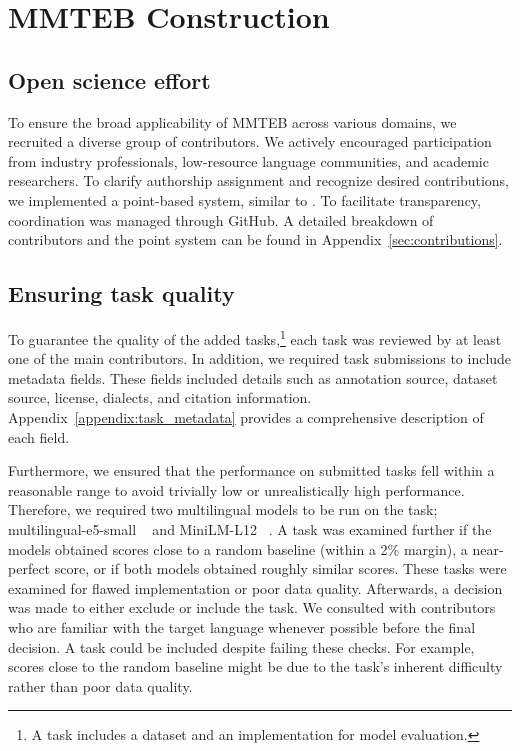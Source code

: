 \section{MMTEB Construction}

\subsection{Open science effort}
\label{sec:open-source-effort}
To ensure the broad applicability of MMTEB across various domains, we recruited a diverse group of contributors. We actively encouraged participation from industry professionals, low-resource language communities, and academic researchers. To clarify authorship assignment and recognize desired contributions, we implemented a point-based system, similar to \citet{lovenia2024seacrowd}.
To facilitate transparency, coordination was managed through GitHub. 
A detailed breakdown of contributors and the point system can be found in Appendix~\ref{sec:contributions}.

\subsection{Ensuring task quality}

To guarantee the quality of the added tasks,\footnote{A task includes a dataset and an implementation for model evaluation.} each task was reviewed by at least one of the main contributors. In addition, we required task submissions to include metadata fields. These fields included details such as annotation source, dataset source, license, dialects, and citation information. Appendix~\ref{appendix:task_metadata} provides a comprehensive description of each field. 

Furthermore, we ensured that the performance on submitted tasks fell within a reasonable range to avoid trivially low or unrealistically high performance. Therefore, we required two multilingual models to be run on the task; multilingual-e5-small
~\citep{wang2022text} and MiniLM-L12
~\citep{reimers2019sentencebert}.
A task was examined further if the models obtained scores close to a random baseline (within a 2\% margin), a near-perfect score, or if both models obtained roughly similar scores. 
These tasks were examined for flawed implementation or poor data quality. Afterwards, a decision was made to either exclude or include the task. We consulted with contributors who are familiar with the target language whenever possible before the final decision. A task could be included despite failing these checks. For example, scores close to the random baseline might be due to the task's inherent difficulty rather than poor data quality.

